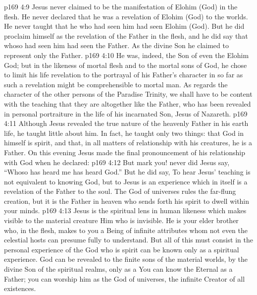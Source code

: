 \vs p169 4:9 Jesus never claimed to be the manifestation of Elohim (God) in the flesh. He never declared that he was a revelation of Elohim (God) to the worlds. He never taught that he who had seen him had seen Elohim (God). But he did proclaim himself as the revelation of the Father in the flesh, and he did say that whoso had seen him had seen the Father. As the divine Son he claimed to represent only the Father.
\vs p169 4:10 He was, indeed, the Son of even the Elohim God; but in the likeness of mortal flesh and to the mortal sons of God, he chose to limit his life revelation to the portrayal of his Father’s character in so far as such a revelation might be comprehensible to mortal man. As regards the character of the other persons of the Paradise Trinity, we shall have to be content with the teaching that they are altogether like the Father, who has been revealed in personal portraiture in the life of his incarnated Son, Jesus of Nazareth.
\vs p169 4:11 \pc Although Jesus revealed the true nature of the heavenly Father in his earth life, he taught little about him. In fact, he taught only two things: that God in himself is spirit, and that, in all matters of relationship with his creatures, he is a Father. On this evening Jesus made the final pronouncement of his relationship with God when he declared: 
\vs p169 4:12 But mark you! never did Jesus say, “Whoso has heard me has heard God.” But he did say,  To hear Jesus’ teaching is not equivalent to knowing God, but to  Jesus is an experience which in itself is a revelation of the Father to the soul. The God of universes rules the far\hyp{}flung creation, but it is the Father in heaven who sends forth his spirit to dwell within your minds.
\vs p169 4:13 Jesus is the spiritual lens in human likeness which makes visible to the material creature Him who is invisible. He is your elder brother who, in the flesh, makes  to you a Being of infinite attributes whom not even the celestial hosts can presume fully to understand. But all of this must consist in the personal experience of the  God who is spirit can be known only as a spiritual experience. God can be revealed to the finite sons of the material worlds, by the divine Son of the spiritual realms, only as a  You can know the Eternal as a Father; you can worship him as the God of universes, the infinite Creator of all existences.
